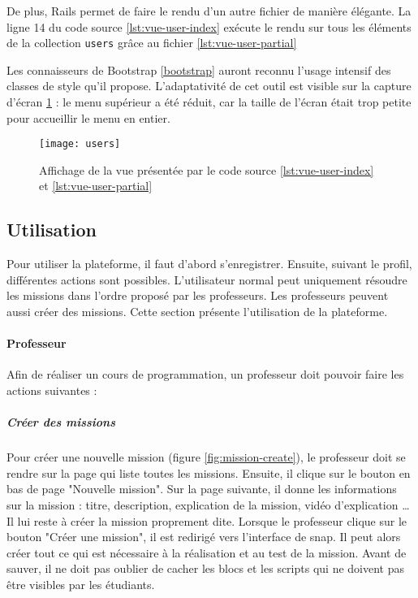 \begin{figure}

\end{figure}
De plus, Rails permet de faire le rendu d'un autre fichier de manière élégante. La ligne 14 du code source \ref{lst:vue-user-index} exécute le rendu sur tous les éléments de la collection \texttt{users} grâce au fichier \ref{lst:vue-user-partial}

Les connaisseurs de Bootstrap \ref{bootstrap} auront reconnu l'usage intensif des classes de style qu'il propose. L'adaptativité de cet outil est visible sur la capture d'écran \ref{fig:vue-users} : le menu supérieur a été réduit, car la taille de l'écran était trop petite pour accueillir le menu en entier.

\begin{figure}
  \begin{center}
    \texttt{[image: users]}
    \caption{Affichage de la vue présentée par le code source \ref{lst:vue-user-index} et \ref{lst:vue-user-partial}}
    \label{fig:vue-users}
  \end{center}
\end{figure}

\subsection{Utilisation}
Pour utiliser la plateforme, il faut d'abord s'enregistrer. Ensuite, suivant le profil, différentes actions sont possibles. L'utilisateur normal peut uniquement résoudre les \glspl{mission} dans l'ordre proposé par les professeurs. Les professeurs peuvent aussi créer des \glspl{mission}. Cette section présente l'utilisation de la plateforme.

\paragraph{Professeur}
Afin de réaliser un cours de programmation, un professeur doit pouvoir faire les actions suivantes :
\subparagraph{Créer des missions} Pour créer une nouvelle \gls{mission} (figure \ref{fig:mission-create}), le professeur doit se rendre sur la page qui liste toutes les \glspl{mission}. Ensuite, il clique sur le bouton en bas de page "Nouvelle \gls{mission}". Sur la page suivante, il donne les informations sur la \gls{mission} : titre, description, explication de la \gls{mission}, vidéo d'explication \ldots Il lui reste à créer la \gls{mission} proprement dite. Lorsque le professeur clique sur le bouton "Créer une \gls{mission}", il est redirigé vers l'interface de \gls{snap}. Il peut alors créer tout ce qui est nécessaire à la réalisation et au test de la \gls{mission}. Avant de sauver, il ne doit pas oublier de cacher les \glspl{bloc} et les \glspl{script} qui ne doivent pas être visibles par les étudiants.

